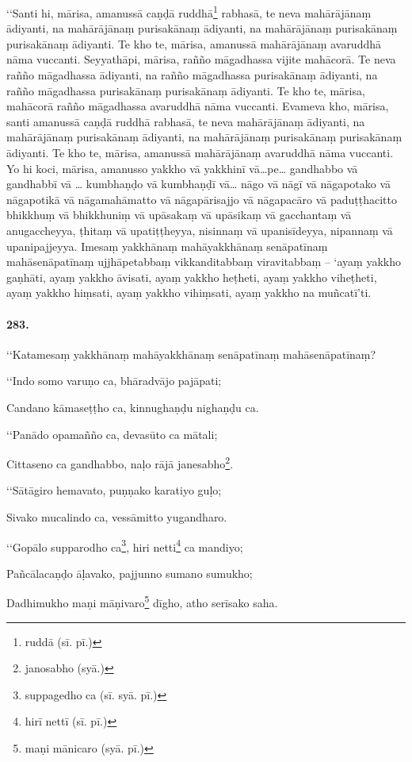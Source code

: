‘‘Santi hi, mārisa, amanussā caṇḍā ruddhā\footnote{ruddā (sī. pī.)} rabhasā, te neva mahārājānaṃ ādiyanti, na mahārājānaṃ purisakānaṃ ādiyanti, na mahārājānaṃ purisakānaṃ purisakānaṃ ādiyanti. Te kho te, mārisa, amanussā mahārājānaṃ avaruddhā nāma vuccanti. Seyyathāpi, mārisa, rañño māgadhassa vijite mahācorā. Te neva rañño māgadhassa ādiyanti, na rañño māgadhassa purisakānaṃ ādiyanti, na rañño māgadhassa purisakānaṃ purisakānaṃ ādiyanti. Te kho te, mārisa, mahācorā rañño māgadhassa avaruddhā nāma vuccanti. Evameva kho, mārisa, santi amanussā caṇḍā ruddhā rabhasā, te neva mahārājānaṃ ādiyanti, na mahārājānaṃ purisakānaṃ ādiyanti, na mahārājānaṃ purisakānaṃ purisakānaṃ ādiyanti. Te kho te, mārisa, amanussā mahārājānaṃ avaruddhā nāma vuccanti. Yo hi koci, mārisa, amanusso yakkho vā yakkhinī vā…pe… gandhabbo vā gandhabbī vā … kumbhaṇḍo vā kumbhaṇḍī vā… nāgo vā nāgī vā nāgapotako vā nāgapotikā vā nāgamahāmatto vā nāgapārisajjo vā nāgapacāro vā paduṭṭhacitto bhikkhuṃ vā bhikkhuniṃ vā upāsakaṃ vā upāsikaṃ vā gacchantaṃ vā anugaccheyya, ṭhitaṃ vā upatiṭṭheyya, nisinnaṃ vā upanisīdeyya, nipannaṃ vā upanipajjeyya. Imesaṃ yakkhānaṃ mahāyakkhānaṃ senāpatīnaṃ mahāsenāpatīnaṃ ujjhāpetabbaṃ vikkanditabbaṃ viravitabbaṃ – ‘ayaṃ yakkho gaṇhāti, ayaṃ yakkho āvisati, ayaṃ yakkho heṭheti, ayaṃ yakkho viheṭheti, ayaṃ yakkho hiṃsati, ayaṃ yakkho vihiṃsati, ayaṃ yakkho na muñcatī’ti.

\paragraph{283.} ‘‘Katamesaṃ yakkhānaṃ mahāyakkhānaṃ senāpatīnaṃ mahāsenāpatīnaṃ?

‘‘Indo somo varuṇo ca, bhāradvājo pajāpati;

Candano kāmaseṭṭho ca, kinnughaṇḍu nighaṇḍu ca.

‘‘Panādo opamañño ca, devasūto ca mātali;

Cittaseno ca gandhabbo, naḷo rājā janesabho\footnote{janosabho (syā.)}.

‘‘Sātāgiro hemavato, puṇṇako karatiyo guḷo;

Sivako mucalindo ca, vessāmitto yugandharo.

‘‘Gopālo supparodho ca\footnote{suppagedho ca (sī. syā. pī.)}, hiri netti\footnote{hirī nettī (sī. pī.)} ca mandiyo;

Pañcālacaṇḍo āḷavako, pajjunno sumano sumukho;

Dadhimukho maṇi māṇivaro\footnote{maṇi mānicaro (syā. pī.)} dīgho, atho serīsako saha.

